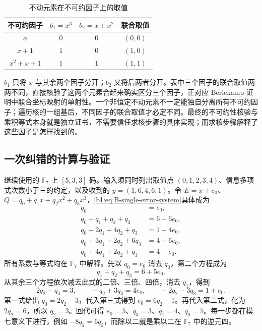 \begin{table}[htbp]
	\centering
	\caption{不动元素在不可约因子上的取值}
	\label{b1:tab:B-berlekamp-values}
	\begin{tabular}{@{}cccc@{}}
		\toprule
		不可约因子 & \(b_1=x^3\) & \(b_2=x+x^2\) & 联合取值 \\
		\midrule
		\(x\) & \(0\) & \(0\) & \((0,0)\) \\
		\(x+1\) & \(1\) & \(0\) & \((1,0)\) \\
		\(x^2+x+1\) & \(1\) & \(1\) & \((1,1)\) \\
		\bottomrule
	\end{tabular}
\end{table}

\(b_1\) 只将 \(x\) 与其余两个因子分开；\(b_2\) 又将后两者分开。表中三个因子的联合取值两两不同，直接核验了这两个元素合起来确实区分三个因子，正对应 Berlekamp 证明中联合坐标映射的单射性。一个非恒定不动元素不一定能独自分离所有不可约因子；遍历核的一组基后，不同因子的联合取值才必定不同。最终的不可约性核验与乘积等式本身就是独立证书，不需要信任求核步骤的具体实现；而求核步骤解释了这些因子是怎样找到的。

\subsection{一次纠错的计算与验证}
\label{b1:subsec:B04:02}

继续使用的 \(\mathbb F_7\) 上 \([5,3,3]\) 码。输入须同时列出取值点 \((0,1,2,3,4)\)、信息多项式次数小于三的约定，以及收到的 \(y=(1,6,4,6,1)\)。令 \(E=x+e_0\)、\(Q=q_0+q_1x+q_2x^2+q_3x^3\)，\eqref{b1:eq:B-single-error-system}具体成为
\[
	\begin{aligned}
		q_0&=e_0,\\
		q_0+q_1+q_2+q_3&=6+6e_0,\\
		q_0+2q_1+4q_2+q_3&=1+4e_0,\\
		q_0+3q_1+2q_2+6q_3&=4+6e_0,\\
		q_0+4q_1+2q_2+q_3&=4+e_0.
	\end{aligned}
\]
所有系数与等式均在 \(\mathbb F_7\) 中解释。先以 \(q_0=e_0\) 消去 \(q_0\)，第二个方程成为
\[
	q_1+q_2+q_3=6+5e_0.
\]
从其余三个方程依次减去此式的二倍、三倍、四倍，消去 \(q_1\)，得到
\[
	2q_2-q_3=3,\qquad -q_2+3q_3=4e_0,\qquad -2q_2-3q_3=1+e_0.
\]
第一式给出 \(q_3=2q_2-3\)，代入第三式得到 \(e_0=6q_2+1\)。再代入第二式，化为 \(2q_2=6\)，所以 \(q_2=3\)。回代可得 \(e_0=5\)、\(q_3=3\)、\(q_1=4\)、\(q_0=5\)。每一步都在模七意义下进行，例如 \(-8q_2=6q_2\)，而除以二就是乘以二在 \(\mathbb F_7\) 中的逆元四。

